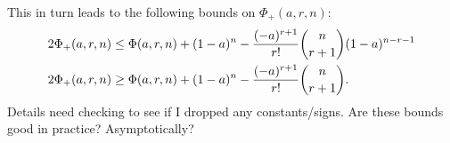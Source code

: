 This in turn leads to the following bounds on $\Phi_+(a,r,n)$:
\begin{align}
\hspace{-2cm}2\Phi_+(a,r,n) &\le \Phi(a,r,n)+ (1-a)^n - \frac{(-a)^{r+1}}{r!} \binom{n}{r+1} (1-a)^{n-r-1} \nonumber \\
2\Phi_+(a,r,n) & \ge\Phi(a,r,n)+ (1-a)^n - \frac{(-a)^{r+1}}{r!} \binom{n}{r+1} .
\end{align}
Details need checking to see if I dropped any constants/signs. Are these bounds good in practice? Asymptotically?

